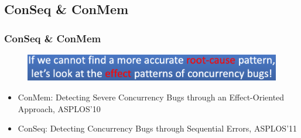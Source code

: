 \subsection{ConSeq \& ConMem} %
\begin{frame}[fragile]
    \frametitle{ConSeq & ConMem}
    \begin{figure}
    \includegraphics[width=0.4\linewidth]{figs/ConSeq-idea.png}
    \end{figure}

    \begin{itemize}
	    \item ConMem: Detecting Severe Concurrency Bugs through an Effect-Oriented Approach, ASPLOS’10
	    \item ConSeq: Detecting Concurrency Bugs through Sequential Errors, ASPLOS’11
	\end{itemize}
\end{frame}


